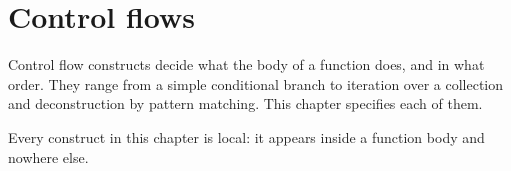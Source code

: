 \chapter{Control flows}%

\label{chap:flow}

Control flow constructs decide what the body of a function does, and in what
order. They range from a simple conditional branch to iteration over a collection
and deconstruction by pattern matching. This chapter specifies each of them.

Every construct in this chapter is local: it appears inside a function body and
nowhere else.

\minitoc%











